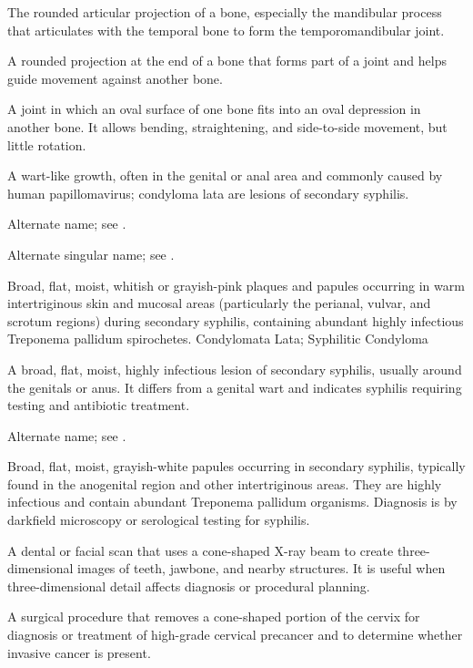  The rounded articular projection of a bone, especially the mandibular process that
articulates with the temporal bone to form the temporomandibular joint.

 A rounded projection at the end of a bone that forms part of a joint and helps guide movement against another bone.

 A joint in which an oval surface of one bone fits into an oval depression in another bone. It allows bending, straightening, and side-to-side movement, but little rotation.

 A wart-like growth, often in the genital or anal area and commonly caused by human papillomavirus; condyloma lata are lesions of secondary syphilis.

 Alternate name; see .

 Alternate singular name; see .

 Broad, flat, moist, whitish or grayish-pink plaques and papules occurring in warm intertriginous skin and mucosal areas (particularly the perianal, vulvar, and scrotum regions) during secondary syphilis, containing abundant highly infectious Treponema pallidum spirochetes.
\synonyms
Condylomata Lata; Syphilitic Condyloma

 A broad, flat, moist, highly infectious lesion of secondary syphilis, usually around the genitals or anus. It differs from a genital wart and indicates syphilis requiring testing and antibiotic treatment.

 Alternate name; see .

 Broad, flat, moist, grayish-white papules occurring in secondary syphilis, typically
found in the anogenital region and other intertriginous areas. They are highly
infectious and contain abundant Treponema pallidum organisms. Diagnosis is by darkfield
microscopy or serological testing for syphilis.

 A dental or facial scan that uses a cone-shaped X-ray beam to create three-dimensional images of teeth, jawbone, and nearby structures. It is useful when three-dimensional detail affects diagnosis or procedural planning.

 A surgical procedure that removes a cone-shaped portion of the cervix for diagnosis or treatment of high-grade cervical precancer and to determine whether invasive cancer is present.

